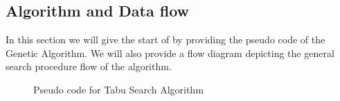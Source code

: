 \subsection{Algorithm and Data flow}
In this section we will give the start of by providing the pseudo code of the Genetic Algorithm. We will also provide a flow diagram depicting the general search procedure flow of the algorithm. 
\begin{figure}[h]
	\centering
	\setlength \fboxsep{0pt}
	\setlength \fboxrule{0.5pt}
	\caption{Pseudo code for Tabu Search Algorithm}
	\label{fig:GAlgorithmPseudoCode}
\end{figure}
